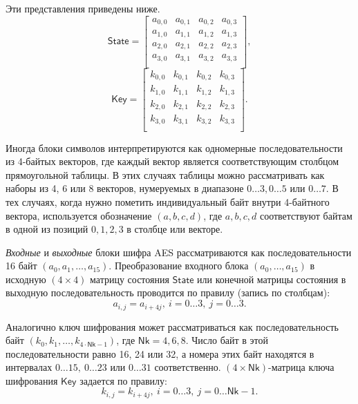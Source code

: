 Эти представления приведены ниже.
\[
    \mathsf{State} = \left[ \begin{array}{cccc}
        a_{0,0} & a_{0,1} & a_{0,2} & a_{0,3} \\
        a_{1,0} & a_{1,1} & a_{1,2} & a_{1,3} \\
        a_{2,0} & a_{2,1} & a_{2,2} & a_{2,3} \\
        a_{3,0} & a_{3,1} &a_{3,2} & a_{3,3}  \\
    \end{array} \right],
\] \[
    \mathsf{Key} = \left[ \begin{array}{cccc}
        k_{0,0} & k_{0,1} & k_{0,2} & k_{0,3} \\
        k_{1,0} & k_{1,1} & k_{1,2} & k_{1,3} \\
        k_{2,0} & k_{2,1} & k_{2,2} & k_{2,3} \\
        k_{3,0} & k_{3,1} & k_{3,2} & k_{3,3} \\
    \end{array} \right].
\]

Иногда блоки символов интерпретируются как одномерные последовательности из 4-байтых векторов, где каждый вектор является соответствующим столбцом прямоугольной таблицы. В этих случаях таблицы можно рассматривать как наборы из 4, 6 или 8 векторов, нумеруемых в диапазоне $0 \dots 3, 0 \dots 5$ или $0 \dots 7$. В тех случаях, когда нужно пометить индивидуальный байт внутри 4-байтного вектора, используется обозначение $(a, b, c, d)$, где $a, b, c, d$ соответствуют байтам в одной из позиций $0, 1, 2, 3$ в столбце или векторе.

\textit{Входные} и \textit{выходные} блоки шифра AES рассматриваются как последовательности 16 байт $(a_0, a_1, \dots, a_{15})$. Преобразование входного блока $(a_0, \dots, a_{15})$ в исходную $(4 \times 4)$ матрицу состояния $\mathsf{State}$ или конечной матрицы состояния в выходную последовательность проводится по правилу (запись по столбцам):
    \[ a_{i,j} = a_{i + 4j}, ~ i = 0 \dots 3, ~ j = 0 \dots 3. \]

Аналогично ключ шифрования может рассматриваться как последовательность байт $(k_0, k_1, \dots, k_{4 \cdot \mathsf{Nk} - 1})$, где $\mathsf{Nk} = 4, 6, 8$. Число байт в этой последовательности равно 16, 24 или 32, а номера этих байт находятся в интервалах $0 \dots 15, ~ 0 \dots 23$ или $0 \dots 31$ соответственно. $(4 \times \mathsf{Nk})$-матрица ключа шифрования $\mathsf{Key}$ задается по правилу:
    \[ k_{i,j} = k_{i + 4j}, ~ i = 0 \dots 3, ~ j = 0 \dots \mathsf{Nk} - 1. \]

